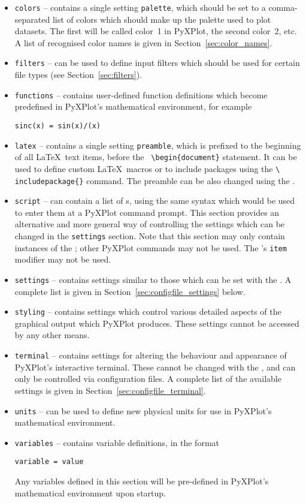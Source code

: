 \begin{itemize}
\item {\tt colors} -- contains a single setting {\tt palette}, which should be
set to a comma-separated list of colors which should make up the palette used
to plot datasets. The first will be called color~1 in PyXPlot, the second
color~2, etc. A list of recognised color names is given in
Section~\ref{sec:color_names}.
\item {\tt filters} -- can be used to define input filters which should be used
for certain file types (see Section~\ref{sec:filters}).
\item {\tt functions} -- contains user-defined function definitions which
become predefined in PyXPlot's mathematical environment, for example
\begin{verbatim}
sinc(x) = sin(x)/(x)
\end{verbatim}
\item {\tt latex} -- contains a single setting {\tt preamble}, which is
prefixed to the beginning of all \LaTeX\ text items, before the {\tt
\textbackslash begin\{document\}} statement. It can be used to define custom
\LaTeX\ macros or to include packages using the {\tt \textbackslash
includepackage\{\}} command.  The preamble can be also changed using the
.
\item {\tt script} -- can contain a list of s, using the same
syntax which would be used to enter them at a PyXPlot command prompt. This
section provides an alternative and more general way of controlling the
settings which can be changed in the {\tt settings} section. Note that this
section may only contain instances of the ; other PyXPlot
commands may not be used. The 's {\tt item} modifier may not be
used.
\item {\tt settings} -- contains settings similar to those which can be set
with the . A complete list is given in
Section~\ref{sec:configfile_settings} below.
\item {\tt styling} -- contains settings which control various detailed aspects
of the graphical output which PyXPlot produces. These settings cannot be
accessed by any other means.
\item {\tt terminal} -- contains settings for altering the behaviour and
appearance of PyXPlot's interactive terminal. These cannot be changed with the
, and can only be controlled via configuration files. A complete
list of the available settings is given in
Section~\ref{sec:configfile_terminal}.
\item {\tt units} -- can be used to define new physical units for use in
PyXPlot's mathematical environment.
\item {\tt variables} -- contains variable definitions, in the format
\begin{verbatim}
variable = value
\end{verbatim}
Any variables defined in this section will be pre-defined in PyXPlot's
mathematical environment upon startup.

\end{itemize}

